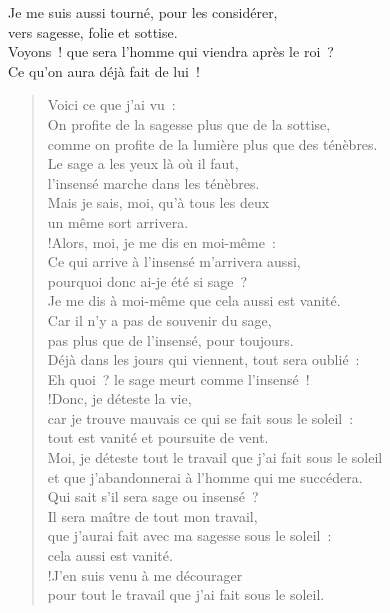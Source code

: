 \documentclass[french,twoside]{book} %
\def\mednobreak{\ifdim\lastskip<\medskipamount
  \removelastskip\nopagebreak\medskip\fi}
\newcommand{\labelblock}[1]{\medbreak{\noindent\color{rubric}\bfseries #1}\par\mednobreak}
\begin{document}
\labelblock{Bilan décevant}

Je me suis aussi tourné, pour les considérer, \\
vers sagesse, folie et sottise. \\
Voyons ! que sera l’homme qui viendra après le roi ? \\
Ce qu’on aura déjà fait de lui !\\

\begin{verse}
Voici ce que j’ai vu : \\
On profite de la sagesse plus que de la sottise, \\
comme on profite de la lumière plus que des ténèbres.\\
Le sage a les yeux là où il faut, \\
l’insensé marche dans les ténèbres. \\
Mais je sais, moi, qu’à tous les deux \\
un même sort arrivera.\\!Alors, moi, je me dis en moi-même : \\
Ce qui arrive à l’insensé m’arrivera aussi, \\
pourquoi donc ai-je été si sage ? \\
Je me dis à moi-même que cela aussi est vanité.\\
Car il n’y a pas de souvenir du sage, \\
pas plus que de l’insensé, pour toujours. \\
Déjà dans les jours qui viennent, tout sera oublié : \\
Eh quoi ? le sage meurt comme l’insensé !\\!Donc, je déteste la vie, \\
car je trouve mauvais ce qui se fait sous le soleil : \\
tout est vanité et poursuite de vent.\\
Moi, je déteste tout le travail que j’ai fait sous le soleil \\
et que j’abandonnerai à l’homme qui me succédera.\\
Qui sait s’il sera sage ou insensé ? \\
Il sera maître de tout mon travail, \\
que j’aurai fait avec ma sagesse sous le soleil : \\
cela aussi est vanité.\\!J’en suis venu à me décourager \\
pour tout le travail que j’ai fait sous le soleil.\\

\end{verse}
\end{document}
